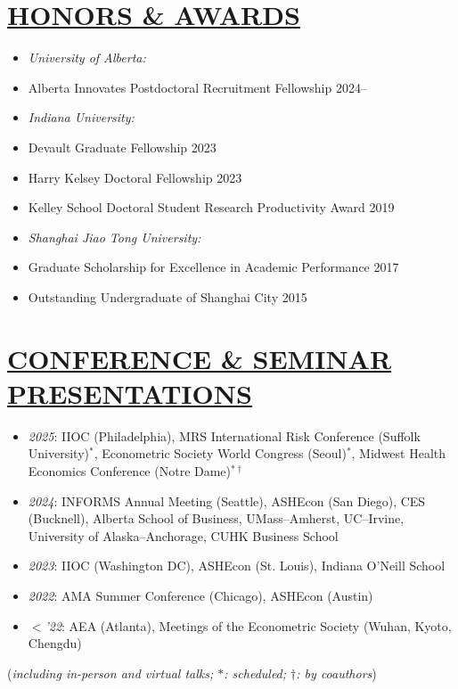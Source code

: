 \documentclass{res}
\begin{document}
\begin{resume}
\section{\large{\ul{HONORS \& AWARDS}}}
\vspace{1.8em}
\begin{itemize}[leftmargin=!,labelindent=-15pt,itemindent=-15pt,itemsep=0.1em]
\item[] \textit{University of Alberta:}
    \item[] \hspace{15pt} Alberta Innovates Postdoctoral Recruitment Fellowship \hfill 2024--
\item[] \textit{Indiana University:}
    \item[] \hspace{15pt} Devault Graduate Fellowship \hfill 2023
    \item[] \hspace{15pt} Harry Kelsey Doctoral Fellowship \hfill 2023
    \item[] \hspace{15pt} Kelley School Doctoral Student Research Productivity Award \hfill 2019
\item[] \textit{Shanghai Jiao Tong University:}
    \item[] \hspace{15pt} Graduate Scholarship for Excellence in Academic Performance \hfill 2017
    \item[] \hspace{15pt} Outstanding Undergraduate of Shanghai City \hfill 2015
\end{itemize}

\section{\large{\ul{CONFERENCE \& SEMINAR PRESENTATIONS}}}
\vspace{1.8em}
\begin{itemize}[leftmargin=!,labelindent=-15pt,itemindent=-24pt,itemsep=0.1em]
\item[] \textit{2025}: IIOC (Philadelphia), MRS International Risk Conference (Suffolk University)$^*$, Econometric Society World Congress (Seoul)$^*$, Midwest Health Economics Conference (Notre Dame)$^{*\dagger}$
\item[] \textit{2024}: INFORMS Annual Meeting (Seattle), ASHEcon (San Diego), CES (Bucknell), Alberta School of Business, UMass–Amherst, UC–Irvine, University of Alaska–Anchorage, CUHK Business School
\item[] \textit{2023}: IIOC (Washington DC), ASHEcon (St. Louis), Indiana O'Neill School 
\item[] \textit{2022}: AMA Summer Conference (Chicago), ASHEcon (Austin) 
\item[] \textit{$<$'22}: AEA (Atlanta), Meetings of the Econometric Society (Wuhan, Kyoto, Chengdu)
\end{itemize}
\hfill {\small (\textit{including in-person and virtual talks; $*$: scheduled; $\dagger$: by coauthors})}

\end{resume}
\end{document}
